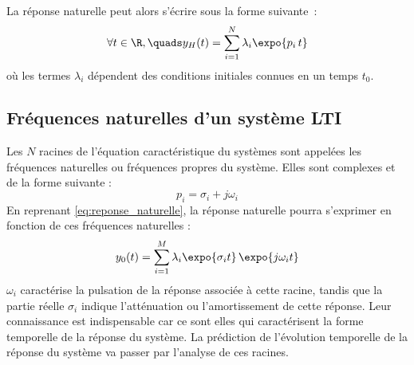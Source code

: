 La réponse naturelle peut alors s'écrire sous la forme
suivante~:
\begin{equation}\label{eq:reponse_naturelle}
  \forall t\in\R,\quads y_{H}(t) = \sum_{i=1}^N \lambda_{i} \expo{p_i\,t}
\end{equation}
où les termes $\lambda_{i}$ dépendent des conditions initiales
connues en un temps $t_{0}$.	

\subsection{Fréquences naturelles d'un système LTI}
Les $N$ racines de l'équation caractéristique du systèmes sont
appelées les fréquences naturelles ou fréquences propres du
système. Elles sont complexes et de la forme suivante :
\begin{equation}\label{freq_propre}
  p_{i} = \sigma_{i} + j\omega_{i} 
\end{equation}	
En reprenant \ref{eq:reponse_naturelle}, la réponse naturelle
pourra s'exprimer en fonction de ces fréquences naturelles :		
\begin{equation}\label{eq:reponse_naturelle_freq}
  y_{0}(t) = \sum_{i=1}^M \lambda_{i}\expo{\sigma_{i}t}\,\expo{j\omega_{i}t}
\end{equation}
$\omega_{i}$ caractérise la pulsation de la réponse associée à
cette racine, tandis que la partie réelle $\sigma_{i}$ indique
l'atténuation ou l'amortissement de cette réponse. Leur
connaissance est indispensable car ce sont elles qui
caractérisent la forme temporelle de la réponse du système. La
prédiction de l'évolution temporelle de la réponse du système
va passer par l'analyse de ces racines.


